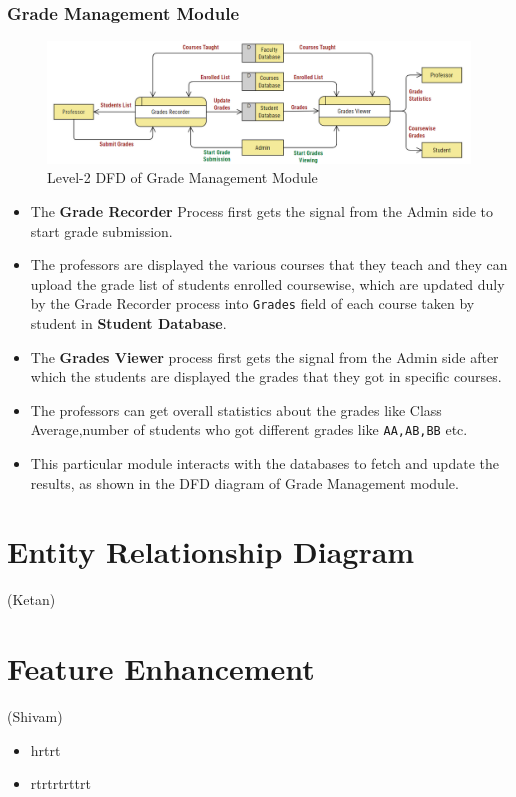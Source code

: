 \documentclass[12pt,a4paper]{article}
\begin{document}
\subsubsection{Grade Management Module}
\begin{figure}[hbt!]
    \centering
        \includegraphics[width=\linewidth]{Grade_Management_DFD.png} 
    \caption{Level-2 DFD of Grade Management Module}
\end{figure}
\begin{itemize}
    \item The \textbf{Grade Recorder} Process first gets the signal from the Admin side to start grade submission.
    \item The professors are displayed the various courses that they teach and they can upload the grade list of students enrolled coursewise, which are updated duly by the Grade Recorder process into \texttt{Grades} field of each course taken by student in \textbf{Student Database}.
    \item The \textbf{Grades Viewer} process first gets the signal from the Admin side after which the students are displayed the grades that they got in specific courses.
    \item The professors can get overall statistics about the grades like Class Average,number of students who got different grades like \texttt{AA,AB,BB} etc.
    \item This particular module interacts with the databases to fetch and update the results, as shown in the DFD diagram of Grade Management module.
\end{itemize}
\section{Entity Relationship Diagram}
(Ketan)

\section{Feature Enhancement}
(Shivam)
\begin{itemize}
    \item hrtrt
    \item rtrtrtrttrt
\end{itemize}
        
\end{document}
